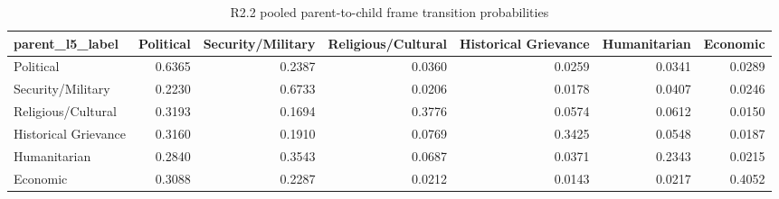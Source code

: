 \begin{table}
\caption{R2.2 pooled parent-to-child frame transition probabilities}
\label{tab:r1r2_transition_pooled}
\begin{tabular}{lrrrrrr}
\toprule
parent\_l5\_label & Political & Security/Military & Religious/Cultural & Historical Grievance & Humanitarian & Economic \\
\midrule
Political & 0.6365 & 0.2387 & 0.0360 & 0.0259 & 0.0341 & 0.0289 \\
Security/Military & 0.2230 & 0.6733 & 0.0206 & 0.0178 & 0.0407 & 0.0246 \\
Religious/Cultural & 0.3193 & 0.1694 & 0.3776 & 0.0574 & 0.0612 & 0.0150 \\
Historical Grievance & 0.3160 & 0.1910 & 0.0769 & 0.3425 & 0.0548 & 0.0187 \\
Humanitarian & 0.2840 & 0.3543 & 0.0687 & 0.0371 & 0.2343 & 0.0215 \\
Economic & 0.3088 & 0.2287 & 0.0212 & 0.0143 & 0.0217 & 0.4052 \\
\bottomrule
\end{tabular}
\end{table}
